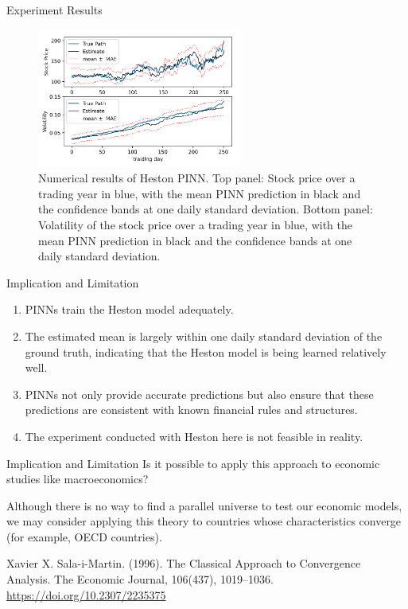 \begin{frame}{Experiment Results}
    \begin{figure}[H]
        \centering
        \includegraphics[width=0.6\textwidth]{img/figure2.png}
        \caption{Numerical results of Heston PINN. Top panel: Stock price over a trading year in blue, with the mean PINN prediction in black and the confidence bands at one daily standard deviation. Bottom panel: Volatility of the stock price over a trading year in blue, with the mean PINN prediction in black and the confidence bands at one daily standard deviation.}
        \label{fig:heston_results}
    \end{figure}
\end{frame}

\begin{frame}{Implication and Limitation}
    \begin{enumerate}
        \item PINNs train the Heston model adequately.
        \item The estimated mean is largely within one daily standard deviation of the ground truth, indicating that the Heston model is being learned relatively well.
        \item PINNs not only provide accurate predictions but also ensure that these predictions are consistent with known financial rules and structures. 
        \item The experiment conducted with Heston here is not feasible in reality.
    \end{enumerate}
\end{frame}

\begin{frame}{Implication and Limitation}
    Is it possible to apply this approach to economic studies like macroeconomics?

    Although there is no way to find a parallel universe to test our economic models, we may consider applying this theory to countries whose characteristics converge (for example, OECD countries).

    Xavier X. Sala-i-Martin. (1996). The Classical Approach to Convergence Analysis. The Economic Journal, 106(437), 1019–1036. \url{https://doi.org/10.2307/2235375}
\end{frame}